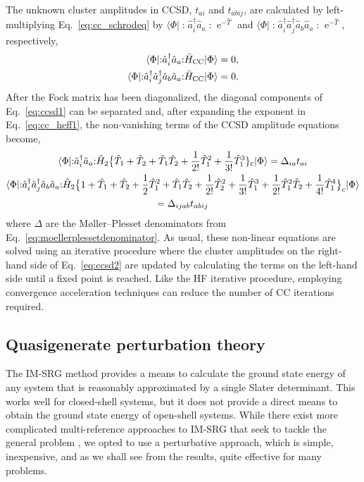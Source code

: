 \documentclass[aip, jcp, 12pt]{revtex4-1}
\newcommand{\E}{\operatorname{e}}
\newcommand{\bra}[1]{\langle #1 |}
\newcommand{\ket}[1]{| #1 \rangle}
\newcommand{\normord}[1]{\mathopen: #1 \mathclose:}
\begin{document}
The unknown cluster amplitudes in CCSD, $t_{a i}$ and $t_{a b i j}$, are calculated by left-multiplying Eq.\ \eqref{eq:cc_schrodeq} by $\bra{\Phi} \normord{\hat a_i^\dagger \hat a_a} \E^{-\hat{T}}$ and $\bra{\Phi} \normord{\hat a_i^\dagger \hat a_j^\dagger \hat a_b \hat a_a} \E^{-\hat{T}}$, respectively,
\begin{align} \label{eq:ccsd1}
  \bra{\Phi} \normord{\hat a_i^\dagger \hat a_a} \bar{H}_{\mathrm{CC}} \ket{\Phi} &= 0, \\
  \bra{\Phi} \normord{\hat a_i^\dagger \hat a_j^\dagger \hat a_b \hat a_a}\bar{H}_{\mathrm{CC}} \ket{\Phi} &= 0. \notag
\end{align}
After the Fock matrix has been diagonalized, the diagonal components of Eq.\ \eqref{eq:ccsd1} can be separated and, after expanding the exponent in Eq.\ \eqref{eq:cc_heff1}, the non-vanishing terms of the CCSD amplitude equations become,
\begin{gather} \label{eq:ccsd2}
  \bra{\Phi} \normord{\hat a_i^\dagger \hat a_a} \hat{H}_2 \bigl\{\hat{T}_1 + \hat{T}_2 + \hat{T}_1\hat{T}_2 + \frac{1}{2!} \hat{T}_1^{2} + \frac{1}{3!} \hat{T}_1^{3}\}_{\mathrm{c}} \ket{\Phi} = \Delta_{i a} t_{a i} \\
  \bra{\Phi} \normord{\hat a_i^\dagger \hat a_j^\dagger \hat a_b \hat a_a} \hat{H}_2 \bigl\{1 + \hat{T}_1 + \hat{T}_2 + \frac{1}{2} \hat{T}_1^{2} + \hat{T}_1\hat{T}_2 + \frac{1}{2!} \hat{T}_2^{2} + \frac{1}{3!} \hat{T}_1^{3} + \frac{1}{2!} \hat{T}_1^{2} \hat{T}_2 + \frac{1}{4!} \hat{T}_1^{4}\bigr\}_{\mathrm{c}} \ket{\Phi} \notag \\
= \Delta_{i j a b} t_{a b i j} \notag
\end{gather}
where $\Delta$ are the M\o ller--Plesset denominators from Eq.\ \eqref{eq:moellerplessetdenominator}.  As usual, these non-linear equations are solved using an iterative procedure where the cluster amplitudes on the right-hand side of Eq.\ \eqref{eq:ccsd2} are updated by calculating the terms on the left-hand side until a fixed point is reached.  Like the HF iterative procedure, employing convergence acceleration techniques can reduce the number of CC iterations required.

\subsection{Quasigenerate perturbation theory}
\label{subsec:selfenergy}

The IM-SRG method provides a means to calculate the ground state energy of any system that is reasonably approximated by a single Slater determinant.  This works well for closed-shell systems, but it does not provide a direct means to obtain the ground state energy of open-shell systems.  While there exist more complicated multi-reference approaches to IM-SRG that seek to tackle the general problem \cite{Hergert2016165}, we opted to use a perturbative approach, which is simple, inexpensive, and as we shall see from the results, quite effective for many problems.
\end{document}
